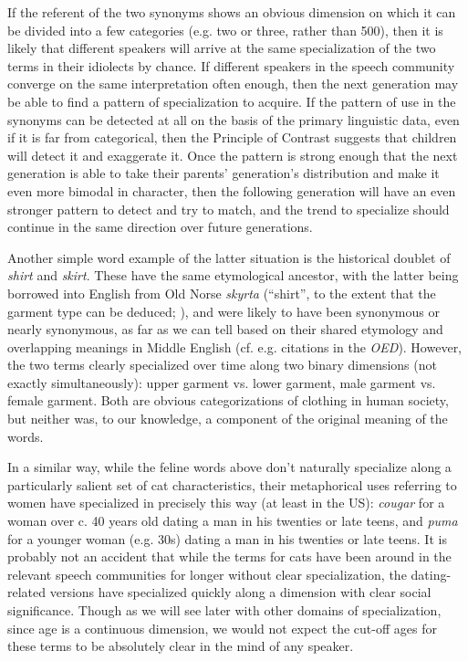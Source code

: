 If the referent of the two synonyms shows an obvious dimension on which it can be divided into a few categories (e.g. two or three, rather than 500), then it is likely that different speakers will arrive at the same specialization of the two terms in their idiolects by chance.
If different speakers in the speech community converge on the same interpretation often enough, then the next generation may be able to find a pattern of specialization to acquire.
If the pattern of use in the synonyms can be detected at all on the basis of the primary linguistic data, even if it is far from categorical, then the Principle of Contrast suggests that children will detect it and exaggerate it.
Once the pattern is strong enough that the next generation is able to take their parents' generation's distribution and make it even more bimodal in character, then the following generation will have an even stronger pattern to detect and try to match, and the trend to specialize should continue in the same direction over future generations.

Another simple word example of the latter situation is the historical doublet of \textsl{shirt} and \textsl{skirt}.
These have the same etymological ancestor, with the latter being borrowed into English from Old Norse \textsl{skyrta} (``shirt'', to the extent that the garment type can be deduced; \citealt{cleasbyvigfusson}), and were likely to have been synonymous or nearly synonymous, as far as we can tell based on their shared etymology and overlapping meanings in Middle English (cf. e.g. citations in the \textsl{OED}).
However, the two terms clearly specialized over time along two binary dimensions (not exactly simultaneously): upper garment vs. lower garment, male garment vs. female garment.
Both are obvious categorizations of clothing in human society, but neither was, to our knowledge, a component of the original meaning of the words.

In a similar way, while the feline words above don't naturally specialize along a particularly salient set of cat characteristics, their metaphorical uses referring to women have specialized in precisely this way (at least in the US): \textsl{cougar} for a woman over c. 40 years old dating a man in his twenties or late teens, and \textsl{puma} for a younger woman (e.g. 30s) dating a man in his twenties or late teens.
It is probably not an accident that while the terms for cats have been around in the relevant speech communities for longer without clear specialization, the dating-related versions have specialized quickly along a dimension with clear social significance.
Though as we will see later with other domains of specialization, since age is a continuous dimension, we would not expect the cut-off ages for these terms to be absolutely clear in the mind of any speaker. %

